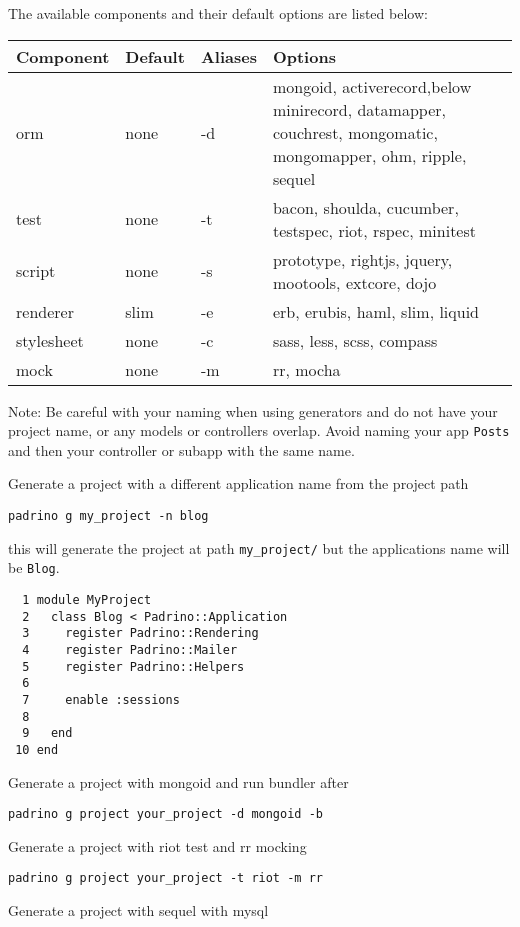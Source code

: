 The available components and their default options are listed below:

\begin{tabular}{|p{2cm}|l|l|p{12cm}|}
\hline
Component    &  Default   &   Aliases & Options \\ \hline
orm          &  none      &       -d  & mongoid, activerecord,below minirecord, datamapper, couchrest, mongomatic, mongomapper, ohm, ripple, sequel \\ \hline
test         &  none      &       -t  & bacon, shoulda, cucumber, testspec, riot, rspec, minitest \\ \hline
script       &  none      &       -s  & prototype, rightjs,            jquery, mootools, extcore, dojo \\ \hline
renderer     &  slim      &       -e  & erb, erubis, haml,       slim, liquid \\ \hline
stylesheet   &  none      &       -c  & sass, less, scss, compass \\ \hline
mock         &  none      &       -m  & rr, mocha \\ \hline
\end{tabular}
Note: Be careful with your naming when using generators and do not
have your project name, or any models or controllers overlap. Avoid
naming your app \verb|Posts| and then your controller or subapp
with the same name. 



Generate a project with a different application name from the project path

\begin{verbatim}
padrino g my_project -n blog
\end{verbatim}
this will generate the project at path \verb|my_project/| but the applications name will be \verb|Blog|.
\begin{verbatim}
  1 module MyProject
  2   class Blog < Padrino::Application
  3     register Padrino::Rendering
  4     register Padrino::Mailer
  5     register Padrino::Helpers
  6 
  7     enable :sessions
  8 
  9   end
 10 end
\end{verbatim}

Generate a project with mongoid and run bundler after

\begin{verbatim}
padrino g project your_project -d mongoid -b
\end{verbatim}
Generate a project with riot test and rr mocking

\begin{verbatim}
padrino g project your_project -t riot -m rr
\end{verbatim}
Generate a project with sequel with mysql

